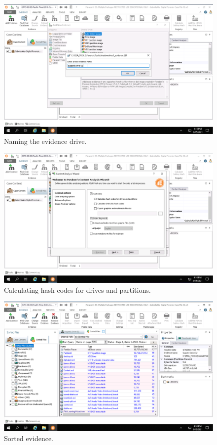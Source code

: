 \begin{figure}[H]
    \centering
    \includegraphics[width=\linewidth]{figures/1-4.png}
    \caption{Naming the evidence drive.}
\end{figure}

\begin{figure}[H]
    \centering
    \includegraphics[width=\linewidth]{figures/1-5.png}
    \caption{Calculating hash codes for drives and partitions.}
\end{figure}

\begin{figure}[H]
    \centering
    \includegraphics[width=\linewidth]{figures/1-8.png}
    \caption{Sorted evidence.}
\end{figure}

